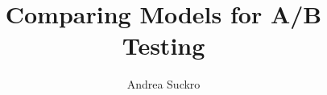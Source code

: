 \documentclass[11pt, oneside, openright, utf8, bachelor, english, subfiles]{base/thesis}
\institute{Institute of Cognitive Science \break \break Intuit Data Engineering and Analytics}
\title{Comparing Models for A/B Testing}
\author{Andrea Suckro}
\begin{document}
\maketitle

\begin{abstract}

\end{abstract}


\tableofcontents

\mainpart






\appendix

\listoffigures
\listofalgorithms



\declaration
\end{document}
